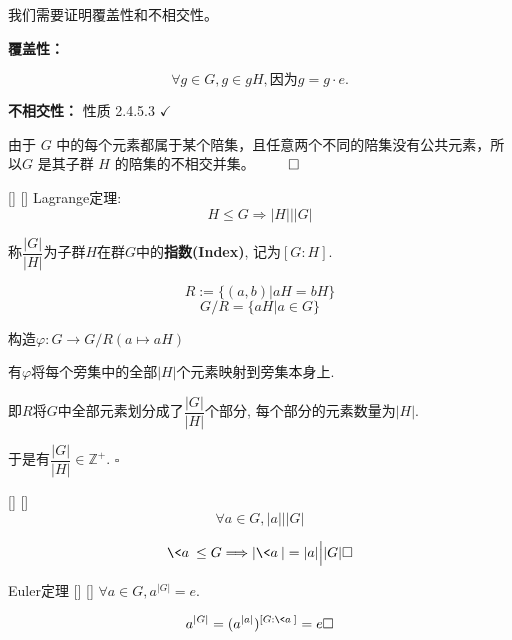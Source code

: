 \documentclass[UTF8]{ctexart}
\begin{document}
            \begin{prf}
                我们需要证明覆盖性和不相交性。

                \textbf{覆盖性：} 
                
                \[\forall g \in G,g \in gH ,\text{因为}  g = g \cdot e .\] 

                \textbf{不相交性：} 性质 2.4.5.3 $\checkmark$
                
                由于 \( G \) 中的每个元素都属于某个陪集，且任意两个不同的陪集没有公共元素，所以\( G \) 是其子群 \( H \) 的陪集的不相交并集。
                $\qed$
            \end{prf} 
  
		\begin{thm}
            []
            {}
            []
            []
			Lagrange定理: 
			\[H\leq G\Longrightarrow|H|{\Big|}|G|\]

			称$\dfrac{|G|}{|H|}$为子群$H$在群$G$中的\textbf{指数(Index)}, 记为$[G:H]$. 
		\end{thm}	
		
		\begin{prf}
			\[R:=\{(a,b)|aH=bH\}\]
			\[G/R=\{aH|a\in G\}\]
			
			构造$\varphi: G\to G/R(a\mapsto aH)$
			
			有$\varphi$将每个旁集中的全部$|H|$个元素映射到旁集本身上. 
			
			即$R$将$G$中全部元素划分成了$\dfrac{|G|}{|H|}$个部分, 每个部分的元素数量为$|H|$. 
			
			于是有$\dfrac{|G|}{|H|}\in\mathbb{Z}^{+}$. $\square$
		\end{prf}
  
		\begin{ppt}
            []
            {}
            []
            []
			\[\forall a\in G, |a|\Big||G|\]
		\end{ppt}
		
		\begin{prf}
			\[\<a\>\leq G\Longrightarrow |\<a\>|=|a|\Big||G|\square\]
		\end{prf}
  
		\begin{ppt}
            []
            {Euler定理}
            []
            []
			$\forall a\in G, a^{|G|}=e. $
		\end{ppt}
		
		\begin{prf}	
			\[a^{|G|}=(a^{|a|})^{[G:\<a\>]}=e\square\]
	\end{prf}
 
\end{document}
